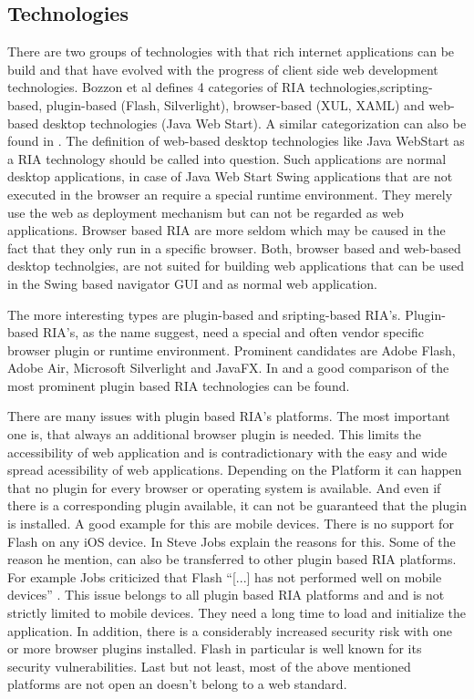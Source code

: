 \subsection{Technologies}

There are two groups of technologies with that rich internet applications can be build and that have evolved with the progress of client side web development technologies.
Bozzon et al \autocite{ria-classification-1} defines 4 categories of RIA technologies,scripting-based, plugin-based (Flash, Silverlight), browser-based (XUL, XAML) and web-based desktop technologies (Java Web Start).
A similar categorization can also be found in \autocite{ria-classification-2}.
The definition of web-based desktop technologies like Java WebStart as a RIA technology should be called into question.
Such applications are normal desktop applications, in case of Java Web Start Swing applications that are not executed in the browser an require a special runtime environment.
They merely use the web as deployment mechanism but can not be regarded as web applications.
Browser based RIA are more seldom which may be caused in the fact that they only run in a specific browser.
Both, browser based and web-based desktop technolgies,  are not suited for building web applications that can be used in the Swing based navigator GUI and as normal web application.

The more interesting types are plugin-based and sripting-based RIA's.
Plugin-based RIA's, as the name suggest, need a special and often vendor specific browser plugin or runtime environment.
Prominent candidates are Adobe Flash, Adobe Air, Microsoft Silverlight and JavaFX.
In \autocite[]{ria-comp-1} and \autocite[]{ria-comp-2} a good comparison of the most prominent plugin based RIA technologies can be found.

There are many issues with plugin based RIA's platforms.
The most important one is, that always an additional browser plugin is needed.
This limits the accessibility of web application and is contradictionary with the easy and wide spread acessibility of web applications.
Depending on the Platform it can happen that no plugin for every browser or operating system is available.
And even if there is a corresponding plugin available, it can not be guaranteed that the plugin is installed.
A good example for this are mobile devices.
There is no support for Flash on any iOS device.
In \autocite[]{jobs-thoughts-on-flash} Steve Jobs explain the reasons for this.
Some of the reason he mention, can also be transferred to other plugin based RIA platforms.
For example Jobs criticized that Flash \enquote{[...] has not performed well on mobile devices} \autocite[]{jobs-thoughts-on-flash}.
This issue belongs to all plugin based RIA platforms and and is not strictly limited to mobile devices.
They need a long time to load and initialize the application.
In addition, there is a considerably increased security risk with one or more browser plugins installed.
Flash in particular is well known for its security vulnerabilities.
Last but not least, most of the above mentioned platforms are not open an doesn't belong to a web standard.

